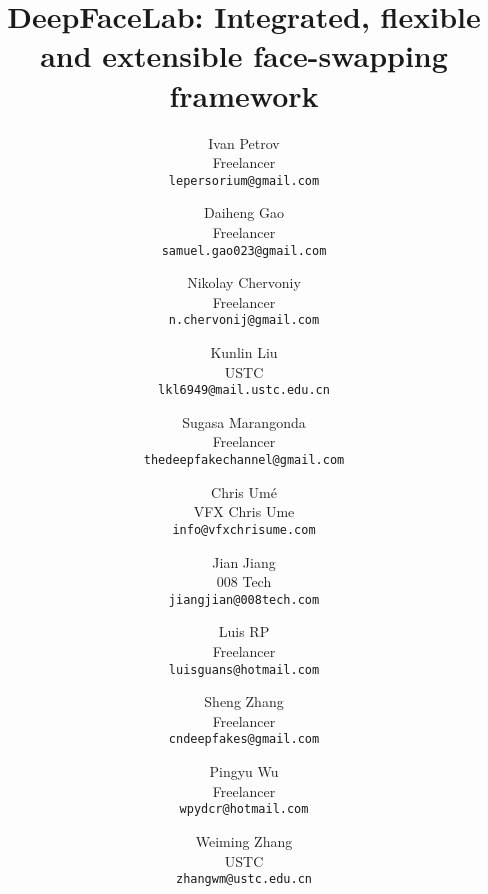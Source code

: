 \documentclass[10pt,twocolumn,letterpaper]{article}
\begin{document}
\title{DeepFaceLab: Integrated, flexible and extensible face-swapping framework}


\author{Ivan Petrov\\
	Freelancer\\
	\texttt{lepersorium@gmail.com} \\
\and
	Daiheng Gao \\
	Freelancer\\
	\texttt{samuel.gao023@gmail.com} \\
	\and
	Nikolay Chervoniy \\
	Freelancer\\
	\texttt{n.chervonij@gmail.com} \\
	\and
	Kunlin Liu \\
	USTC\\
	\texttt{lkl6949@mail.ustc.edu.cn} \\
	\and
	Sugasa Marangonda \\
	Freelancer\\
	\texttt{thedeepfakechannel@gmail.com} \\
	\and
	Chris Umé \\
	VFX Chris Ume\\
	\texttt{info@vfxchrisume.com} \\
	\and
	Jian Jiang \\
	008 Tech\\
	\texttt{jiangjian@008tech.com} \\
	\and
	Luis RP \\
	Freelancer\\
	\texttt{luisguans@hotmail.com} \\
	\and
	Sheng Zhang \\
	Freelancer\\
	\texttt{cndeepfakes@gmail.com} \\
	\and
	Pingyu Wu \\
	Freelancer\\
	\texttt{wpydcr@hotmail.com} \\
	\and
	Weiming Zhang \\
	USTC\\
	\texttt{zhangwm@ustc.edu.cn} \\
}


\maketitle
\end{document}

